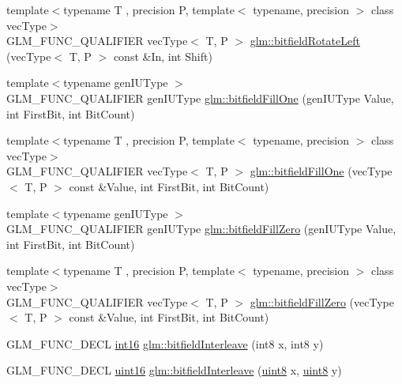 \begin{DoxyCompactItemize}
{\footnotesize template$<$typename T , precision P, template$<$ typename, precision $>$ class vec\+Type$>$ }\\G\+L\+M\+\_\+\+F\+U\+N\+C\+\_\+\+Q\+U\+A\+L\+I\+F\+I\+E\+R vec\+Type$<$ T, P $>$ \hyperlink{group__gtc__bitfield_ga410d130917d85b865718e3ebc32cf0ef}{glm\+::bitfield\+Rotate\+Left} (vec\+Type$<$ T, P $>$ const \&In, int Shift)
\item 
{\footnotesize template$<$typename gen\+I\+U\+Type $>$ }\\G\+L\+M\+\_\+\+F\+U\+N\+C\+\_\+\+Q\+U\+A\+L\+I\+F\+I\+E\+R gen\+I\+U\+Type \hyperlink{group__gtc__bitfield_ga46f9295abe3b5c7658f5b13c7f819f0a}{glm\+::bitfield\+Fill\+One} (gen\+I\+U\+Type Value, int First\+Bit, int Bit\+Count)
\item 
{\footnotesize template$<$typename T , precision P, template$<$ typename, precision $>$ class vec\+Type$>$ }\\G\+L\+M\+\_\+\+F\+U\+N\+C\+\_\+\+Q\+U\+A\+L\+I\+F\+I\+E\+R vec\+Type$<$ T, P $>$ \hyperlink{group__gtc__bitfield_gad789042e84e8292ae95dc1af856f2ad5}{glm\+::bitfield\+Fill\+One} (vec\+Type$<$ T, P $>$ const \&Value, int First\+Bit, int Bit\+Count)
\item 
{\footnotesize template$<$typename gen\+I\+U\+Type $>$ }\\G\+L\+M\+\_\+\+F\+U\+N\+C\+\_\+\+Q\+U\+A\+L\+I\+F\+I\+E\+R gen\+I\+U\+Type \hyperlink{group__gtc__bitfield_ga697b86998b7d74ee0a69d8e9f8819fee}{glm\+::bitfield\+Fill\+Zero} (gen\+I\+U\+Type Value, int First\+Bit, int Bit\+Count)
\item 
{\footnotesize template$<$typename T , precision P, template$<$ typename, precision $>$ class vec\+Type$>$ }\\G\+L\+M\+\_\+\+F\+U\+N\+C\+\_\+\+Q\+U\+A\+L\+I\+F\+I\+E\+R vec\+Type$<$ T, P $>$ \hyperlink{group__gtc__bitfield_gaddba3196316b0bd240295b09b43c2958}{glm\+::bitfield\+Fill\+Zero} (vec\+Type$<$ T, P $>$ const \&Value, int First\+Bit, int Bit\+Count)
\item 
G\+L\+M\+\_\+\+F\+U\+N\+C\+\_\+\+D\+E\+C\+L \hyperlink{stb__image_8c_a259fa4834387bd68627ddf37bb3ebdb9}{int16} \hyperlink{group__gtc__bitfield_ga479134317bc95d99f2b2e235d3db287b}{glm\+::bitfield\+Interleave} (int8 x, int8 y)
\item 
G\+L\+M\+\_\+\+F\+U\+N\+C\+\_\+\+D\+E\+C\+L \hyperlink{stb__image_8c_a05f6b0ae8f6a6e135b0e290c25fe0e4e}{uint16} \hyperlink{group__gtc__bitfield_ga0700a3ceb088a0ecc23d76c154096061}{glm\+::bitfield\+Interleave} (\hyperlink{stb__image_8c_adde6aaee8457bee49c2a92621fe22b79}{uint8} x, \hyperlink{stb__image_8c_adde6aaee8457bee49c2a92621fe22b79}{uint8} y)

\end{DoxyCompactItemize}
